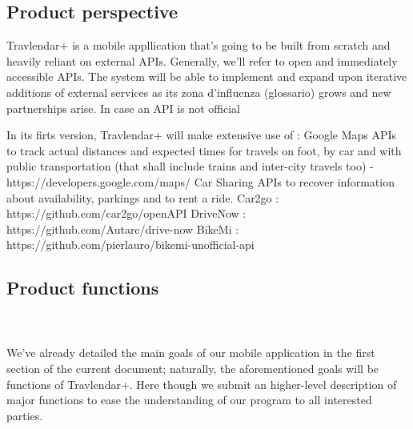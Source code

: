\subsection{Product perspective}

Travlendar+ is a mobile appllication that’s going to be built from scratch and heavily reliant on external APIs. 
Generally, we’ll refer to open and immediately accessible APIs. The system will be able to implement and expand upon iterative additions of external services as its zona d’influenza (glossario) grows and new partnerships arise.
In case an API is not official

In its firts version, Travlendar+ will make extensive use of :
Google Maps APIs to track actual distances and expected times for travels on foot, by car and with public transportation (that shall include trains and inter-city travels too) - https://developers.google.com/maps/
Car Sharing APIs to recover information about availability, parkings and to rent a ride.
	Car2go : https://github.com/car2go/openAPI
	DriveNow : https://github.com/Autarc/drive-now 
BikeMi : https://github.com/pierlauro/bikemi-unofficial-api


			
		\subsection{Product functions}
		
		\hfill \\ \\ 
 We’ve already detailed the main goals of our mobile application in the first section of the current document; naturally, the aforementioned goals will be functions of Travlendar+.
Here though we submit an higher-level description of major functions to ease the understanding of our program to all interested parties.\\
		
	

